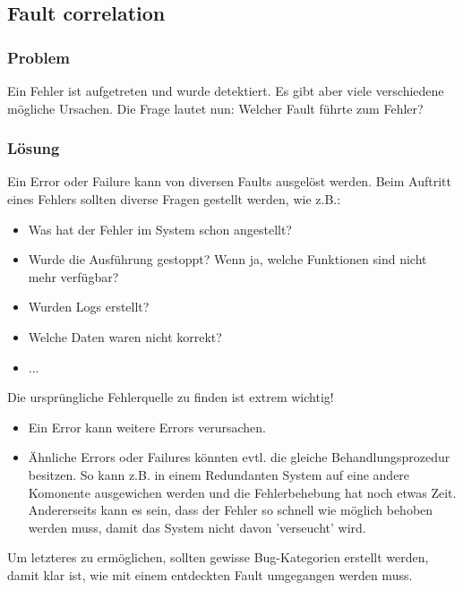 
\subsection{Fault correlation}


\subsubsection*{Problem}

Ein Fehler ist aufgetreten und wurde detektiert. Es gibt aber viele verschiedene mögliche Ursachen.
Die Frage lautet nun: Welcher Fault führte zum Fehler?

\subsubsection*{Lösung}


Ein Error oder Failure kann von diversen Faults ausgelöst werden. Beim Auftritt eines Fehlers sollten diverse Fragen gestellt werden, wie z.B.:
\begin{itemize}
	\item Was hat der Fehler im System schon angestellt?
	\item Wurde die Ausführung gestoppt? Wenn ja, welche Funktionen sind nicht mehr verfügbar?
	\item Wurden Logs erstellt?
	\item Welche Daten waren nicht korrekt?
	\item ...
\end{itemize}

Die ursprüngliche Fehlerquelle zu finden ist extrem wichtig!
\begin{itemize}
	\item Ein Error kann weitere Errors verursachen.
	\item Ähnliche Errors oder Failures könnten evtl. die gleiche Behandlungsprozedur besitzen. So kann z.B. in einem Redundanten System auf eine andere Komonente ausgewichen werden und die Fehlerbehebung hat noch etwas Zeit. Andererseits kann es sein, dass der Fehler so schnell wie möglich behoben werden muss, damit das System nicht davon 'verseucht' wird.
\end{itemize}

Um letzteres zu ermöglichen, sollten gewisse Bug-Kategorien erstellt werden, damit klar ist, wie mit einem entdeckten Fault umgegangen werden muss.
